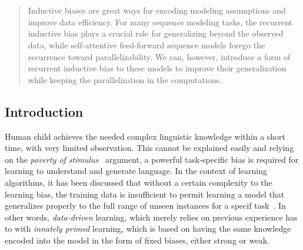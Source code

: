 \chapter{}
\label{chap:6}
%
\begin{quote}
Inductive biases are great ways for encoding modeling assumptions and improve data efficiency. For many sequence modeling tasks, the recurrent inductive bias plays a crucial role for generalizing beyond the observed data, while self-attentive feed-forward sequence models forego the recurrence toward parallelizability. We can, however, introduce a form of recurrent inductive bias to these models to improve their generalization while keeping the parallelization in the computations. 
\end{quote}
%

\section{Introduction}
Human child achieves the needed complex linguistic knowledge within a short time, with very limited observation. This cannot be explained easily and relying on the \emph{poverty of stimulus}~\citep{chomsky1980rules} argument, a powerful task-specific bias is required for learning to understand and generate language. In the context of learning algorithms, it has been discussed that without a certain complexity to the learning bias, the training data is insufficient to permit learning a model that generalizes properly to the full range of unseen instances for a specif task~\cite{Mitchell80theneed}. In other words, \emph{data-driven} learning, which merely relies on previous experience has to  with \emph{innately primed} learning, which is based on having the some knowledge encoded into the model in the form of fixed biases, either strong or weak.

